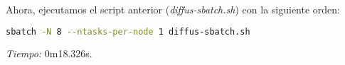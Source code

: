 Ahora, ejecutamos el script anterior (\textit{diffus-sbatch.sh}) con la siguiente orden:
\begin{lstlisting}[language=sh]
	sbatch -N 8 --ntasks-per-node 1 diffus-sbatch.sh
\end{lstlisting}

\textit{Tiempo:} 0m18.326s.

